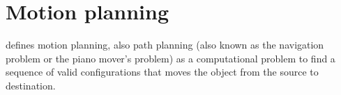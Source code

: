 \documentclass[a4paper]{article}
\begin{document}
    
    \section{Motion planning}
         defines motion planning, also path planning (also known as the navigation problem or the piano mover's problem) as a computational problem to find a sequence of valid configurations that moves the object from the source to destination.
        
        
        
        
\end{document}
